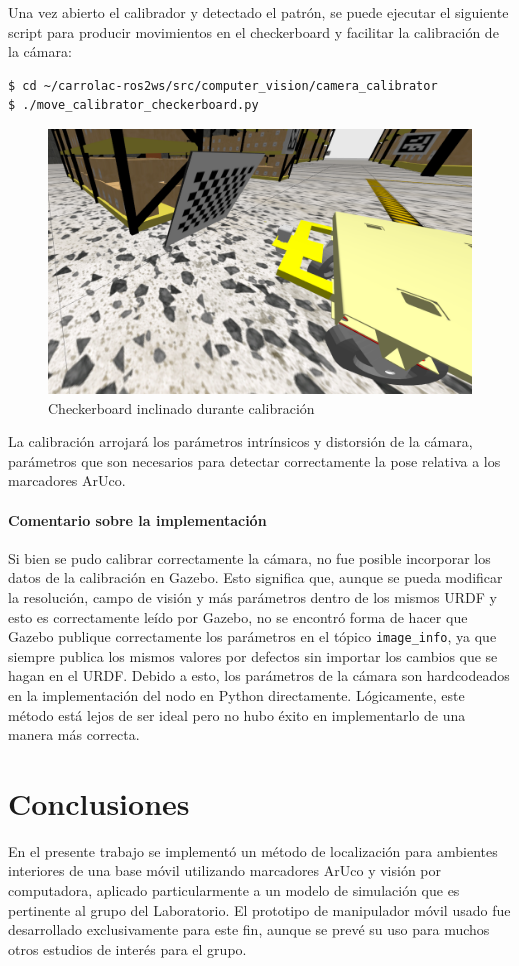 \documentclass[12pt, a4paper]{report}
\begin{document}
			Una vez abierto el calibrador y detectado el patrón, se puede ejecutar el siguiente script para producir movimientos en el checkerboard y facilitar la calibración de la cámara:
	\begin{lstlisting}[language=Bash,label={lst:lstlisting3}]
$ cd ~/carrolac-ros2ws/src/computer_vision/camera_calibrator
$ ./move_calibrator_checkerboard.py
	\end{lstlisting}

	\begin{figure}[H]
		\centering
		\includegraphics[width=0.7\linewidth]{img/Screenshot_20240228_145154}
		\caption{Checkerboard inclinado durante calibración}
		\label{fig:calibracion-cb-inclinado}
	\end{figure}

	La calibración arrojará los parámetros intrínsicos y distorsión de la cámara, parámetros que son necesarios para detectar correctamente la pose relativa a los marcadores ArUco.

	\subsubsection{Comentario sobre la implementación}
	Si bien se pudo calibrar correctamente la cámara, no fue posible incorporar los datos de la calibración en Gazebo.
	Esto significa que, aunque se pueda modificar la resolución, campo de visión y más parámetros dentro de los mismos URDF y esto es correctamente leído por Gazebo, no se encontró forma de hacer que Gazebo publique correctamente los parámetros en el tópico \texttt{image\_info}, ya que siempre publica los mismos valores por defectos sin importar los cambios que se hagan en el URDF.
	Debido a esto, los parámetros de la cámara son hardcodeados en la implementación del nodo en Python directamente.
	Lógicamente, este método está lejos de ser ideal pero no hubo éxito en implementarlo de una manera más correcta.

	\chapter{Conclusiones}
		En el presente trabajo se implementó un método de localización para ambientes interiores de una base móvil utilizando marcadores ArUco y visión por computadora, aplicado particularmente a un modelo de simulación que es pertinente al grupo del Laboratorio.
		El prototipo de manipulador móvil usado fue desarrollado exclusivamente para este fin, aunque se prevé su uso para muchos otros estudios de interés para el grupo.
\end{document}
